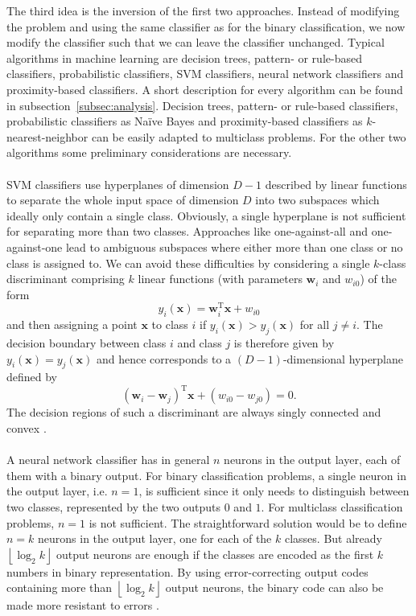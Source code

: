 \documentclass[article,type=msc,colorback,accentcolor=tud7b]{tudthesis}
\begin{document}
\begin{itemize}
        The third idea is the inversion of the first two approaches. Instead of modifying the problem and using the same classifier as for the binary classification, we now modify the classifier such that we can leave the classifier unchanged. Typical algorithms in machine learning are decision trees, pattern- or rule-based classifiers, probabilistic classifiers, SVM classifiers, neural network classifiers and proximity-based classifiers. A short description for every algorithm can be found in subsection~\ref{subsec:analysis}. Decision trees, pattern- or rule-based classifiers, probabilistic classifiers as Naïve Bayes and proximity-based classifiers as $k$-nearest-neighbor can be easily adapted to multiclass problems. For the other two algorithms some preliminary considerations are necessary. \\\\
        SVM classifiers use hyperplanes of dimension $D-1$ described by linear functions to separate the whole input space of dimension $D$ into two subspaces which ideally only contain a single class. Obviously, a single hyperplane is not sufficient for separating more than two classes. Approaches like one-against-all and one-against-one lead to ambiguous subspaces where either more than one class or no class is assigned to. We can avoid these difficulties by considering a single $k$-class discriminant comprising $k$ linear functions (with parameters $\mathbf{w}_{i}$ and $w_{i 0}$) of the form
        \[y_{i}(\mathbf{x})=\mathbf{w}_{i}^{\mathrm{T}} \mathbf{x}+w_{i 0}\]
        and then assigning a point $\mathbf{x}$ to class $i$ if $y_{i}(\mathbf{x})>y_{j}(\mathbf{x})$ for all $j\neq i$. The decision boundary between class $i$ and class $j$ is therefore given by $y_{i}(\mathbf{x})=y_{j}(\mathbf{x})$ and hence corresponds to a $(D-1)$-dimensional hyperplane defined by
        \[\left(\mathbf{w}_{i}-\mathbf{w}_{j}\right)^{\mathrm{T}} \mathbf{x}+\left(w_{i 0}-w_{j 0}\right)=0.\]
        The decision regions of such a discriminant are always singly connected and convex \autocite[Subsection~4.1.2]{Bishop2006}. \\\\
        A neural network classifier has in general $n$ neurons in the output layer, each of them with a binary output. For binary classification problems, a single neuron in the output layer, i.e. $n=1$, is sufficient since it only needs to distinguish between two classes, represented by the two outputs $0$ and $1$. For multiclass classification problems, $n=1$ is not sufficient. The straightforward solution would be to define $n=k$ neurons in the output layer, one for each of the $k$ classes. But already $\left\lfloor\log_{2}k\right\rfloor$ output neurons are enough if the classes are encoded as the first $k$ numbers in binary representation. By using error-correcting output codes containing more than $\left\lfloor\log_{2}k\right\rfloor$ output neurons, the binary code can also be made more resistant to errors \autocite[Subsection~2.1]{Aly2005}.
    \end{itemize}
\end{document}
